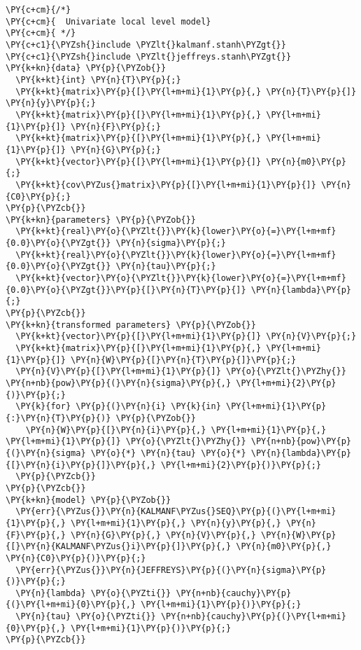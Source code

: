 \begin{Verbatim}[commandchars=\\\{\}]
\PY{c+cm}{/*}
\PY{c+cm}{  Univariate local level model}
\PY{c+cm}{ */}
\PY{c+c1}{\PYZsh{}include \PYZlt{}kalmanf.stanh\PYZgt{}}
\PY{c+c1}{\PYZsh{}include \PYZlt{}jeffreys.stanh\PYZgt{}}
\PY{k+kn}{data} \PY{p}{\PYZob{}}
  \PY{k+kt}{int} \PY{n}{T}\PY{p}{;}
  \PY{k+kt}{matrix}\PY{p}{[}\PY{l+m+mi}{1}\PY{p}{,} \PY{n}{T}\PY{p}{]} \PY{n}{y}\PY{p}{;}
  \PY{k+kt}{matrix}\PY{p}{[}\PY{l+m+mi}{1}\PY{p}{,} \PY{l+m+mi}{1}\PY{p}{]} \PY{n}{F}\PY{p}{;}
  \PY{k+kt}{matrix}\PY{p}{[}\PY{l+m+mi}{1}\PY{p}{,} \PY{l+m+mi}{1}\PY{p}{]} \PY{n}{G}\PY{p}{;}
  \PY{k+kt}{vector}\PY{p}{[}\PY{l+m+mi}{1}\PY{p}{]} \PY{n}{m0}\PY{p}{;}
  \PY{k+kt}{cov\PYZus{}matrix}\PY{p}{[}\PY{l+m+mi}{1}\PY{p}{]} \PY{n}{C0}\PY{p}{;}
\PY{p}{\PYZcb{}}
\PY{k+kn}{parameters} \PY{p}{\PYZob{}}
  \PY{k+kt}{real}\PY{o}{\PYZlt{}}\PY{k}{lower}\PY{o}{=}\PY{l+m+mf}{0.0}\PY{o}{\PYZgt{}} \PY{n}{sigma}\PY{p}{;}
  \PY{k+kt}{real}\PY{o}{\PYZlt{}}\PY{k}{lower}\PY{o}{=}\PY{l+m+mf}{0.0}\PY{o}{\PYZgt{}} \PY{n}{tau}\PY{p}{;}
  \PY{k+kt}{vector}\PY{o}{\PYZlt{}}\PY{k}{lower}\PY{o}{=}\PY{l+m+mf}{0.0}\PY{o}{\PYZgt{}}\PY{p}{[}\PY{n}{T}\PY{p}{]} \PY{n}{lambda}\PY{p}{;}
\PY{p}{\PYZcb{}}
\PY{k+kn}{transformed parameters} \PY{p}{\PYZob{}}
  \PY{k+kt}{vector}\PY{p}{[}\PY{l+m+mi}{1}\PY{p}{]} \PY{n}{V}\PY{p}{;}
  \PY{k+kt}{matrix}\PY{p}{[}\PY{l+m+mi}{1}\PY{p}{,} \PY{l+m+mi}{1}\PY{p}{]} \PY{n}{W}\PY{p}{[}\PY{n}{T}\PY{p}{]}\PY{p}{;}
  \PY{n}{V}\PY{p}{[}\PY{l+m+mi}{1}\PY{p}{]} \PY{o}{\PYZlt{}\PYZhy{}} \PY{n+nb}{pow}\PY{p}{(}\PY{n}{sigma}\PY{p}{,} \PY{l+m+mi}{2}\PY{p}{)}\PY{p}{;}
  \PY{k}{for} \PY{p}{(}\PY{n}{i} \PY{k}{in} \PY{l+m+mi}{1}\PY{p}{:}\PY{n}{T}\PY{p}{)} \PY{p}{\PYZob{}}
    \PY{n}{W}\PY{p}{[}\PY{n}{i}\PY{p}{,} \PY{l+m+mi}{1}\PY{p}{,} \PY{l+m+mi}{1}\PY{p}{]} \PY{o}{\PYZlt{}\PYZhy{}} \PY{n+nb}{pow}\PY{p}{(}\PY{n}{sigma} \PY{o}{*} \PY{n}{tau} \PY{o}{*} \PY{n}{lambda}\PY{p}{[}\PY{n}{i}\PY{p}{]}\PY{p}{,} \PY{l+m+mi}{2}\PY{p}{)}\PY{p}{;}
  \PY{p}{\PYZcb{}}
\PY{p}{\PYZcb{}}
\PY{k+kn}{model} \PY{p}{\PYZob{}}
  \PY{err}{\PYZus{}}\PY{n}{KALMANF\PYZus{}SEQ}\PY{p}{(}\PY{l+m+mi}{1}\PY{p}{,} \PY{l+m+mi}{1}\PY{p}{,} \PY{n}{y}\PY{p}{,} \PY{n}{F}\PY{p}{,} \PY{n}{G}\PY{p}{,} \PY{n}{V}\PY{p}{,} \PY{n}{W}\PY{p}{[}\PY{n}{KALMANF\PYZus{}i}\PY{p}{]}\PY{p}{,} \PY{n}{m0}\PY{p}{,} \PY{n}{C0}\PY{p}{)}\PY{p}{;}
  \PY{err}{\PYZus{}}\PY{n}{JEFFREYS}\PY{p}{(}\PY{n}{sigma}\PY{p}{)}\PY{p}{;}
  \PY{n}{lambda} \PY{o}{\PYZti{}} \PY{n+nb}{cauchy}\PY{p}{(}\PY{l+m+mi}{0}\PY{p}{,} \PY{l+m+mi}{1}\PY{p}{)}\PY{p}{;}
  \PY{n}{tau} \PY{o}{\PYZti{}} \PY{n+nb}{cauchy}\PY{p}{(}\PY{l+m+mi}{0}\PY{p}{,} \PY{l+m+mi}{1}\PY{p}{)}\PY{p}{;}
\PY{p}{\PYZcb{}}
\end{Verbatim}

